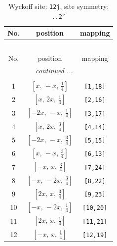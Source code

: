 \documentclass[fleqn,8pt]{jsarticle}
\begin{document}
\begin{longtable}{ccc}
\caption{Wyckoff site: {\tt 12j}, site symmetry: {\tt ..2'}}
 \\
 \hline \hline
No. & position & mapping \\ \hline \endfirsthead

\multicolumn{2}{l}{\tablename\ \thetable{}} \\
 \hline \hline
No. & position & mapping \\ \hline \endhead

 \hline \hline
\multicolumn{2}{r}{\footnotesize\it continued ...} \\ \endfoot

 \hline \hline
\multicolumn{2}{r}{} \\ \endlastfoot

1 & $\left[ x,\, - x,\, \frac{1}{4} \right]$ & {\tt [1,18]} \\ \hline
2 & $\left[ x,\, 2 x,\, \frac{1}{4} \right]$ & {\tt [2,16]} \\ \hline
3 & $\left[ - 2 x,\, - x,\, \frac{1}{4} \right]$ & {\tt [3,17]} \\ \hline
4 & $\left[ x,\, 2 x,\, \frac{3}{4} \right]$ & {\tt [4,14]} \\ \hline
5 & $\left[ - 2 x,\, - x,\, \frac{3}{4} \right]$ & {\tt [5,15]} \\ \hline
6 & $\left[ x,\, - x,\, \frac{3}{4} \right]$ & {\tt [6,13]} \\ \hline
7 & $\left[ - x,\, x,\, \frac{3}{4} \right]$ & {\tt [7,24]} \\ \hline
8 & $\left[ - x,\, - 2 x,\, \frac{3}{4} \right]$ & {\tt [8,22]} \\ \hline
9 & $\left[ 2 x,\, x,\, \frac{3}{4} \right]$ & {\tt [9,23]} \\ \hline
10 & $\left[ - x,\, - 2 x,\, \frac{1}{4} \right]$ & {\tt [10,20]} \\ \hline
11 & $\left[ 2 x,\, x,\, \frac{1}{4} \right]$ & {\tt [11,21]} \\ \hline
12 & $\left[ - x,\, x,\, \frac{1}{4} \right]$ & {\tt [12,19]} \\
\end{longtable}
\renewcommand{\arraystretch}{1.2}
\end{document}

